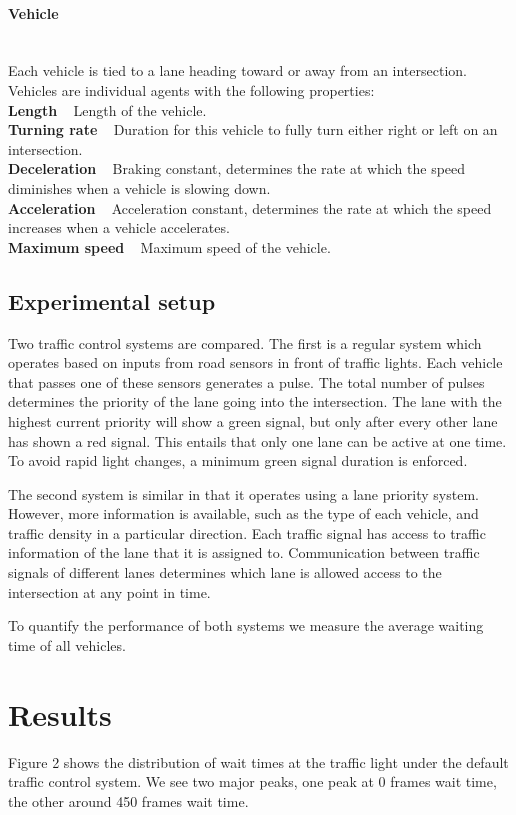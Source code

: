 \documentclass{article}
\begin{document}
\paragraph{Vehicle} ~\\
Each vehicle is tied to a lane heading toward or away from an intersection. Vehicles are individual agents with the following properties:\\
\textbf{Length} ~ Length of the vehicle.\\
\textbf{Turning rate} ~ Duration for this vehicle to fully turn either right or left on an intersection.\\
\textbf{Deceleration} ~ Braking constant, determines the rate at which the speed diminishes when a vehicle is slowing down.\\
\textbf{Acceleration} ~ Acceleration constant, determines the rate at which the speed increases when a vehicle accelerates.\\
\textbf{Maximum speed} ~ Maximum speed of the vehicle.\\

\subsection{Experimental setup}
\label{exp_setup}
Two traffic control systems are compared. The first is a regular system which operates based on inputs from road sensors in front of traffic lights. Each vehicle that passes one of these sensors generates a pulse. The total number of pulses determines the priority of the lane going into the intersection. The lane with the highest current priority will show a green signal, but only after every other lane has shown a red signal. This entails that only one lane can be active at one time. To avoid rapid light changes, a minimum green signal duration is enforced.

The second system is similar in that it operates using a lane priority system. However, more information is available, such as the type of each vehicle, and traffic density in a particular direction. Each traffic signal has access to traffic information of the lane that it is assigned to. Communication between traffic signals of different lanes determines which lane is allowed access to the intersection at any point in time.

To quantify the performance of both systems we measure the average waiting time of all vehicles.

\section{Results}
Figure 2 shows the distribution of wait times at the traffic light under the default traffic control system. We see two major peaks, one peak at 0 frames wait time, the other around 450 frames wait time.
\end{document}
